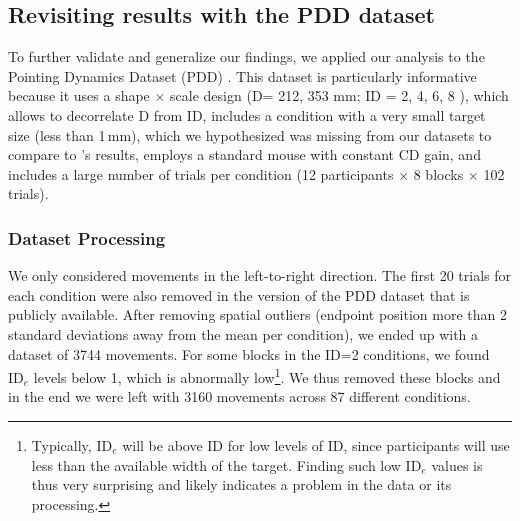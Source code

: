 \documentclass[acmlarge, manuscript,review]{acmart}
\newcommand{\ide}{\ensuremath{{\text{ID}_e}}\xspace}
\newcommand{\D}{\ensuremath{{\text{D}}}\xspace}
\begin{document}
\subsection{Revisiting results with the PDD dataset\label{subs:synthesis:pdd}}
To further validate and generalize our findings, we applied our analysis to the Pointing Dynamics Dataset (PDD) \cite{mueller2017}. This dataset is particularly informative because it uses a shape $\times$ scale design (\D = 212, 353 mm; ID = 2, 4, 6, 8 ), which allows to decorrelate D from ID, includes a condition with a very small target size (less than 1\,mm), which we hypothesized was missing from our datasets to compare to \citeauthor{zhai2004nominal}'s results, employs a standard mouse with constant CD gain, and includes a large number of trials per condition (12 participants $\times$ 8 blocks $\times$ 102 trials).


\subsubsection{Dataset Processing}
We only considered movements in the left-to-right direction. The first 20 trials for each condition were also removed in the version of the PDD dataset that is publicly available. After removing spatial outliers (endpoint position more than 2 standard deviations away from the mean per condition), we ended up with a dataset of 3744 movements. For some blocks in the ID=2 conditions, we found \ide levels below 1, which is abnormally low\footnote{Typically, \ide will be above ID for low levels of ID, since participants will use less than the available width of the target. Finding such low \ide values is thus very surprising and likely indicates a problem in the data or its processing.}. We thus removed these blocks and in the end we were left with 3160 movements across 87 different conditions.
\end{document}
